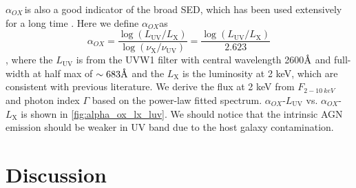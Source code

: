 \documentclass[twocolumn]{aastex63}
\newcommand{\alphaox}{$\alpha_{OX}$}
\newcommand{\angstrom}{\text{\normalfont\AA}}
\begin{document}
 \alphaox \,is also a good indicator of the broad SED, which has been used extensively for a long time \citep[e.g.][]{1979ApJ...234L...9T}. Here we define \alphaox as 
\begin{equation}
\alpha_{OX} = \frac{\log (L_\mathrm{UV} / L_\mathrm{X} )} {\log (\nu_\mathrm{X} /  \nu_\mathrm{UV} )}=\frac{\log (L_\mathrm{UV} / L_\mathrm{X} )}{2.623}
\label{definition_alpha_ox}
\end{equation}
, where the $L_\mathrm{UV}$ is from the UVW1 filter with central wavelength {2600{$\angstrom$}} and full-width at half max of $\sim 683\angstrom$ \citep{2008MNRAS.383..627P} and the $L_\mathrm{X}$ is the luminosity at 2 keV, which are consistent with previous literature. We derive the flux at 2 keV from $F_{2-10~ keV}$ and  photon index $\Gamma$ based on the power-law fitted spectrum. \alphaox-$L_\mathrm{UV}$ vs. \alphaox-$L_\mathrm{X}$ is shown in \autoref{fig:alpha_ox_lx_luv}. We should notice that the intrinsic AGN emission should be weaker in UV band due to the host galaxy contamination. 



\section{Discussion}\label{sec:discussion}
\end{document}
